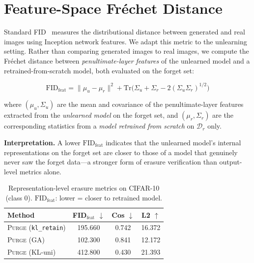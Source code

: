 \documentclass{article}
\newcommand{\ours}{\textsc{Purge}}
\newcommand{\klr}{\texttt{kl\_retain}}
\newcommand{\Dr}{\mathcal{D}_r}
\begin{document}
\section{Feature-Space Fr\'{e}chet Distance}\label{sec:fid}

Standard FID~\cite{heusel2017gans} measures the distributional distance between generated and real images using Inception network features. We adapt this metric to the unlearning setting. Rather than comparing generated images to real images, we compute the Fr\'{e}chet distance between \emph{penultimate-layer features} of the unlearned model and a retrained-from-scratch model, both evaluated on the forget set:

\begin{equation}
    \text{FID}_{\text{feat}} = \|\mu_u - \mu_r\|^2 + \text{Tr}\Big(\Sigma_u + \Sigma_r - 2(\Sigma_u \Sigma_r)^{1/2}\Big)
    \label{eq:fid}
\end{equation}

where $(\mu_u, \Sigma_u)$ are the mean and covariance of the penultimate-layer features extracted from the \emph{unlearned model} on the forget set, and $(\mu_r, \Sigma_r)$ are the corresponding statistics from a \emph{model retrained from scratch} on $\Dr$ only.

\textbf{Interpretation.} A lower $\text{FID}_{\text{feat}}$ indicates that the unlearned model's internal representations on the forget set are closer to those of a model that genuinely never saw the forget data---a stronger form of erasure verification than output-level metrics alone.

\begin{table}[t]
\centering
\small
\caption{Representation-level erasure metrics on CIFAR-10 (class 0). $\text{FID}_{\text{feat}}$: lower = closer to retrained model.}
\label{tab:fid}
\begin{tabular}{lccc}
\toprule
Method & FID$_{\text{feat}}$ $\downarrow$ & Cos $\downarrow$ & L2 $\uparrow$ \\
\midrule
\ours{} (\klr{}) & 195.660 & 0.742 & 16.372 \\
\ours{} (GA) & 102.300 & 0.841 & 12.172 \\
\ours{} (KL-uni) & 412.800 & 0.430 & 21.393 \\
\bottomrule
\end{tabular}
\end{table}
\end{document}
